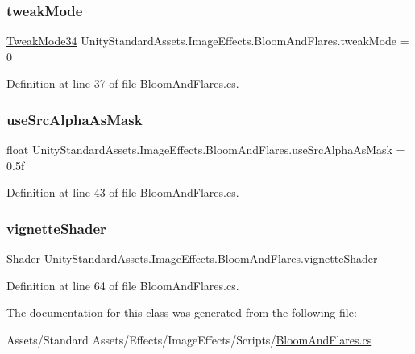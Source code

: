 \subsubsection{\texorpdfstring{tweak\+Mode}{tweakMode}}
{\footnotesize\ttfamily \mbox{\hyperlink{namespace_unity_standard_assets_1_1_image_effects_aad04ccb197e6c2c9f40afbbc5f387460}{Tweak\+Mode34}} Unity\+Standard\+Assets.\+Image\+Effects.\+Bloom\+And\+Flares.\+tweak\+Mode = 0}



Definition at line 37 of file Bloom\+And\+Flares.\+cs.

\mbox{\label{class_unity_standard_assets_1_1_image_effects_1_1_bloom_and_flares_a8df7f61e10eaaa321399dc74c76b3b3a}} 
\subsubsection{\texorpdfstring{use\+Src\+Alpha\+As\+Mask}{useSrcAlphaAsMask}}
{\footnotesize\ttfamily float Unity\+Standard\+Assets.\+Image\+Effects.\+Bloom\+And\+Flares.\+use\+Src\+Alpha\+As\+Mask = 0.\+5f}



Definition at line 43 of file Bloom\+And\+Flares.\+cs.

\mbox{\label{class_unity_standard_assets_1_1_image_effects_1_1_bloom_and_flares_aa59c84ddf8f0431226591467b38ad85e}} 
\subsubsection{\texorpdfstring{vignette\+Shader}{vignetteShader}}
{\footnotesize\ttfamily Shader Unity\+Standard\+Assets.\+Image\+Effects.\+Bloom\+And\+Flares.\+vignette\+Shader}



Definition at line 64 of file Bloom\+And\+Flares.\+cs.



The documentation for this class was generated from the following file\+:\begin{DoxyCompactItemize}
\item 
Assets/\+Standard Assets/\+Effects/\+Image\+Effects/\+Scripts/\mbox{\hyperlink{_bloom_and_flares_8cs}{Bloom\+And\+Flares.\+cs}}\end{DoxyCompactItemize}
